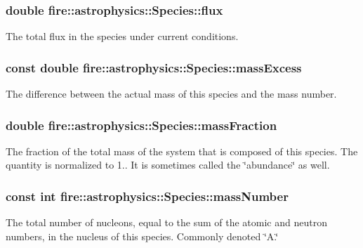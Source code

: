 \subsubsection[{flux}]{\setlength{\rightskip}{0pt plus 5cm}double fire\+::astrophysics\+::\+Species\+::flux}\label{a00039_a9a1512c8b681fe0b829b2f91efa8f1a1}
The total flux in the species under current conditions. \hypertarget{a00039_a3fd8c01bcbb27c20fb80cf9a9e6e1f66}{}
\subsubsection[{mass\+Excess}]{\setlength{\rightskip}{0pt plus 5cm}const double fire\+::astrophysics\+::\+Species\+::mass\+Excess}\label{a00039_a3fd8c01bcbb27c20fb80cf9a9e6e1f66}
The difference between the actual mass of this species and the mass number. \hypertarget{a00039_aa23c930af303e0c2b09491b18888855b}{}
\subsubsection[{mass\+Fraction}]{\setlength{\rightskip}{0pt plus 5cm}double fire\+::astrophysics\+::\+Species\+::mass\+Fraction}\label{a00039_aa23c930af303e0c2b09491b18888855b}
The fraction of the total mass of the system that is composed of this species. The quantity is normalized to 1.. It is sometimes called the \char`\"{}abundance\char`\"{} as well. \hypertarget{a00039_a403a85b9ffb625643b0bd5cf2e944376}{}
\subsubsection[{mass\+Number}]{\setlength{\rightskip}{0pt plus 5cm}const int fire\+::astrophysics\+::\+Species\+::mass\+Number}\label{a00039_a403a85b9ffb625643b0bd5cf2e944376}
The total number of nucleons, equal to the sum of the atomic and neutron numbers, in the nucleus of this species. Commonly denoted \char`\"{}\+A.\char`\"{} \hypertarget{a00039_a4aea10c6b155eaeeb52dedcef2dcf849}{}
